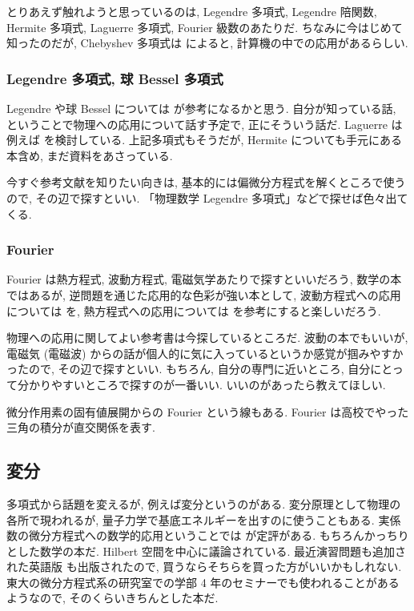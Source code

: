 \documentclass[openany, a4paper, oneside]{jsbook}
\begin{document}
とりあえず触れようと思っているのは, Legendre 多項式, Legendre 陪関数,
Hermite 多項式, Laguerre 多項式, Fourier 級数のあたりだ.
ちなみに今はじめて知ったのだが, Chebyshev 多項式は \cite{HiroshiTanaka1} によると, 計算機の中での応用があるらしい.
\subsubsection{Legendre 多項式, 球 Bessel 多項式}

Legendre や球 Bessel については \cite{NorikatsuMio1} が参考になるかと思う.
自分が知っている話, ということで物理への応用について話す予定で, 正にそういう話だ.
Laguerre は例えば \cite{KenichiKanaya1} を検討している.
上記多項式もそうだが, Hermite についても手元にある本含め, まだ資料をあさっている.

今すぐ参考文献を知りたい向きは, 基本的には偏微分方程式を解くところで使うので, その辺で探すといい.
「物理数学 Legendre 多項式」などで探せば色々出てくる.
\subsubsection{Fourier}

Fourier は熱方程式, 波動方程式, 電磁気学あたりで探すといいだろう,
数学の本ではあるが, 逆問題を通じた応用的な色彩が強い本として,
波動方程式への応用については \cite{NoborizakaOnishiYamamoto1} を,
熱方程式への応用については \cite{KimYamamoto1} を参考にすると楽しいだろう.

物理への応用に関してよい参考書は今探しているところだ.
波動の本でもいいが, 電磁気 (電磁波) からの話が個人的に気に入っているというか感覚が掴みやすかったので,
その辺で探すといい.
もちろん, 自分の専門に近いところ, 自分にとって分かりやすいところで探すのが一番いい.
いいのがあったら教えてほしい.

微分作用素の固有値展開からの Fourier という線もある.
Fourier は高校でやった三角の積分が直交関係を表す.
\subsection{変分}

多項式から話題を変えるが, 例えば変分というのがある.
変分原理として物理の各所で現われるが, 量子力学で基底エネルギーを出すのに使うこともある.
実係数の微分方程式への数学的応用ということでは \cite{HaimBrezis1} が定評がある.
もちろんかっちりとした数学の本だ.
Hilbert 空間を中心に議論されている.
最近演習問題も追加された英語版 \cite{HaimBrezis2} も出版されたので, 買うならそちらを買った方がいいかもしれない.
東大の微分方程式系の研究室での学部 4 年のセミナーでも使われることがあるようなので,
そのくらいきちんとした本だ.
\end{document}
